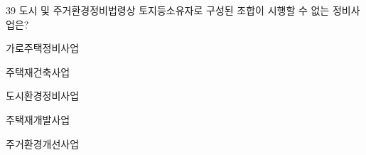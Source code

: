 \begin{question}{39}
도시 및 주거환경정비법령상 토지등소유자로 구성된 조합이 시행할 수 없는 정비사업은?
\begin{choices}
  \item 가로주택정비사업
  \item 주택재건축사업
  \item 도시환경정비사업
  \item 주택재개발사업
  \item 주거환경개선사업
\end{choices}
\end{question}
